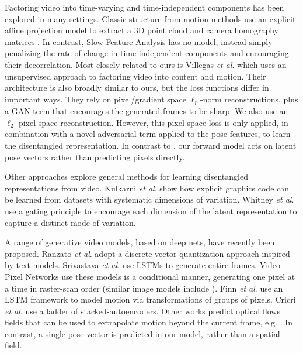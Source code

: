 \documentclass{article}
\newcommand{\etal}{\textit{et al}.\:}
\begin{document}
Factoring video into time-varying and time-independent components has
been explored in many settings. Classic structure-from-motion methods
use an explicit affine projection model to extract a 3D point cloud
and camera homography matrices \cite{hartley2000multiple}. In
contrast, Slow Feature Analysis \cite{Wiskott02} has no model, instead
simply penalizing the rate of change in time-independent components and
encouraging their decorrelation. Most closely related to ours is
Villegas \etal\cite{Villegas17} which uses an unsupervised approach to factoring
video into content and motion. Their architecture is also broadly similar to
ours, but the loss functions differ in important ways. They rely on
pixel/gradient space $\ell_p$-norm reconstructions, plus a GAN term
\cite{goodfellow2014} that encourages the generated frames to be sharp. 
We also use an $\ell_2$ pixel-space reconstruction. However, this pixel-space loss is only applied, in combination with a novel adversarial term applied to the pose features, to learn the disentangled representation.
In contrast to \cite{Villegas17}, our forward model acts on latent pose vectors rather than predicting pixels directly. 

Other approaches explore general methods for learning disentangled
representations from video. Kulkarni \etal\cite{kulkarni2015deep} show how explicit
graphics code can be learned from datasets with systematic dimensions
of variation. Whitney \etal\cite{whitney2016understanding} use a
gating principle to encourage each dimension of the latent
representation to capture a distinct mode of variation.


A range of generative video models, based on deep nets, have recently
been proposed. Ranzato \etal\cite{Ranzato14} adopt a discrete vector
quantization approach inspired by text models. Srivastava \etal\cite{Srivastava15} use
LSTMs to generate entire frames. Video Pixel Networks
\cite{Kalchbrenner16} use these models is a conditional manner,
generating one pixel at a time in raster-scan order (similar image
models include \cite{salimans2017pixelcnn++, Oord16}). Finn \etal\cite{Finn16}
use an LSTM framework to model motion via transformations of groups of
pixels.  Cricri \etal\cite{cricri2016video} use a ladder of stacked-autoencoders.
Other works predict optical flows fields that can be used to
extrapolate motion beyond the current frame,
e.g. \cite{liu09,visualdynamics16,walker15}. In contrast, a single
pose vector is predicted in our model, rather than a spatial field.
 
\end{document}
